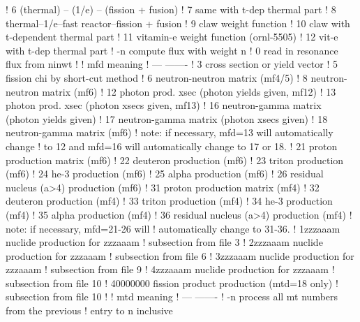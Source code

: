 \begin{ccode}
   !      6           (thermal) -- (1/e) -- (fission + fusion)
   !      7           same with t-dep thermal part
   !      8           thermal--1/e--fast reactor--fission + fusion
   !      9           claw weight function
   !     10           claw with t-dependent thermal part
   !     11           vitamin-e weight function (ornl-5505)
   !     12           vit-e with t-dep thermal part
   !     -n           compute flux with weight n
   !      0           read in resonance flux from ninwt
   !
   !     mfd          meaning
   !     ---          -------
   !      3           cross section or yield vector
   !      5           fission chi by short-cut method
   !      6           neutron-neutron matrix (mf4/5)
   !      8           neutron-neutron matrix (mf6)
   !     12           photon prod. xsec (photon yields given, mf12)
   !     13           photon prod. xsec (photon xsecs given, mf13)
   !     16           neutron-gamma matrix (photon yields given)
   !     17           neutron-gamma matrix (photon xsecs given)
   !     18           neutron-gamma matrix (mf6)
   !         note: if necessary, mfd=13 will automatically change
   !         to 12 and mfd=16 will automatically change to 17 or 18.
   !     21           proton production matrix (mf6)
   !     22           deuteron production (mf6)
   !     23           triton production (mf6)
   !     24           he-3 production (mf6)
   !     25           alpha production (mf6)
   !     26           residual nucleus (a>4) production (mf6)
   !     31           proton production matrix (mf4)
   !     32           deuteron production (mf4)
   !     33           triton production (mf4)
   !     34           he-3 production (mf4)
   !     35           alpha production (mf4)
   !     36           residual nucleus (a>4) production (mf4)
   !          note: if necessary, mfd=21-26 will
   !          automatically change to 31-36.
   !    1zzzaaam       nuclide production for zzzaaam
   !                     subsection from file 3
   !    2zzzaaam       nuclide production for zzzaaam
   !                     subsection from file 6
   !    3zzzaaam       nuclide production for zzzaaam
   !                     subsection from file 9
   !    4zzzaaam       nuclide production for zzzaaam
   !                     subsection from file 10
   !    40000000       fission product production (mtd=18 only)
   !                     subsection from file 10
   !
   !     mtd          meaning
   !     ---          -------
   !     -n           process all mt numbers from the previous
   !                          entry to n inclusive

\end{ccode}
